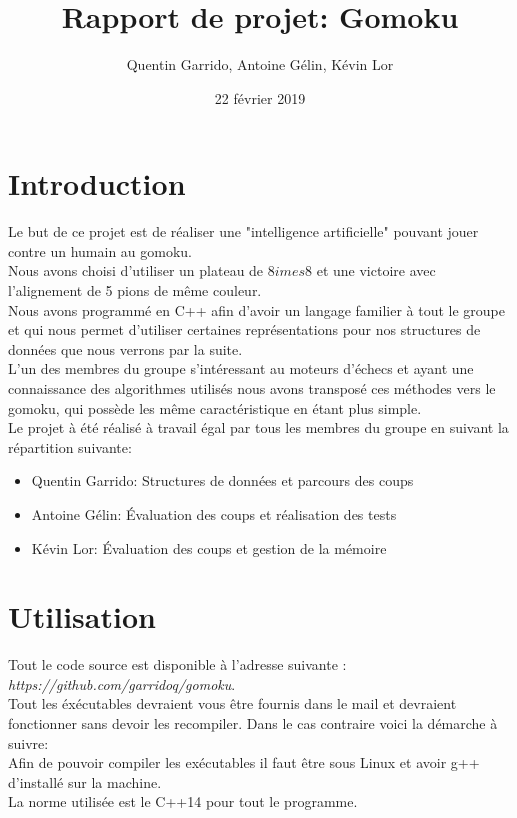 \documentclass{article}
\title{Rapport de projet: Gomoku}
\author{Quentin Garrido, Antoine Gélin, Kévin Lor}
\date{22 février 2019}
\begin{document}
\maketitle
\tableofcontents
\pagebreak

\section{Introduction}

Le but de ce projet est de réaliser une "intelligence artificielle" pouvant jouer contre un humain au gomoku.\\
Nous avons choisi d'utiliser un plateau de 8$	imes$8 et une victoire avec l'alignement de 5 pions de même couleur.\\
Nous avons programmé en C++ afin d'avoir un langage familier à tout le groupe et qui nous permet d'utiliser
certaines représentations pour nos structures de données que nous verrons par la suite.\\
L'un des membres du groupe s'intéressant au moteurs d'échecs et ayant une connaissance des algorithmes utilisés
nous avons transposé ces méthodes vers le gomoku, qui possède les même caractéristique en étant plus simple.\\

Le projet à été réalisé à travail égal par tous les membres du groupe en suivant la répartition suivante:
\begin{itemize}
	\item Quentin Garrido: Structures de données et parcours des coups
	\item Antoine Gélin: Évaluation des coups et réalisation des tests
	\item Kévin Lor: Évaluation des coups et gestion de la mémoire
\end{itemize}

\section{Utilisation}

Tout le code source est disponible à l'adresse suivante : \textit{https://github.com/garridoq/gomoku}.\\

Tout les éxécutables devraient vous être fournis dans le mail et devraient fonctionner sans devoir
les recompiler. Dans le cas contraire voici la démarche à suivre:\\

Afin de pouvoir compiler les exécutables il faut être sous Linux et avoir g++ d'installé sur la machine.\\
La norme utilisée est le C++14 pour tout le programme.\\
\end{document}
